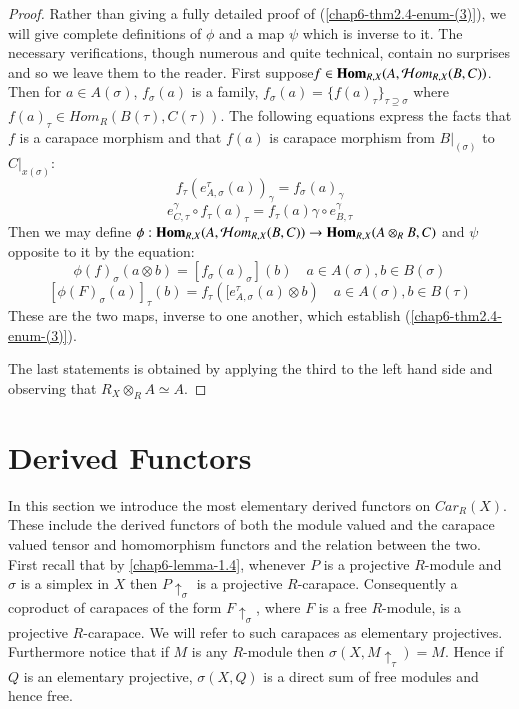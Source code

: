 \begin{proof}
Rather than giving a fully detailed proof of (\ref{chap6-thm2.4-enum-(3)}), we will give complete definitions of $\phi$ and a map $\psi$ which is inverse to it. The necessary verifications, though numerous and quite technical, contain no surprises and so we leave them to the reader. First suppose\break $f \in \operatorname{\mathbf{Hom}}_{R,X}(A, \mathcal{H} om_{R,X}(B, C))$. Then for
$a \in A(\sigma)$, $f_{\sigma}(a)$ is a family, $f_{\sigma}(a)  =\{f(a)_{\tau}\}_{\tau \supseteq \sigma}$ where
$f(a)_{\tau} \in Hom_{R}(B(\tau), C(\tau))$. The following equations express the facts that $f$ is a carapace morphism and that $f(a)$ is carapace morphism from $B|_(\sigma)$ to $C|_{x(\sigma)}$:
\begin{equation}\label{chap6-eq-5}
f_{\tau}(e_{A,\sigma}^{\tau}(a))_{\gamma} = f_{\sigma}(a)_{\gamma}%
\end{equation}
\begin{equation}\label{chap6-eq-6}
e_{C, \tau}^{\gamma} \circ f_{\tau}(a)_{\tau} = f_{\tau}(a)\gamma \circ e_{B,\tau}^{\gamma}
\end{equation}
Then we may define $\phi : \operatorname{\mathbf{Hom}}_{R,X}(A, \mathcal{H} om_{R,X}(B,C))\rightarrow \operatorname{\mathbf{Hom}}_{R,X}(A \otimes_{R}B, C)$ and $\psi$ opposite to it by the equation:
\begin{equation}\label{chap6-eq-7}
\phi(f)_{\sigma}(a\otimes b) =[f_{\sigma}(a)_{\sigma}](b) \quad a\in A(\sigma), b\in B(\sigma)
\end{equation}
\begin{equation}\label{chap6-eq-8}
[\phi (F)_{\sigma}(a)]_{\tau}(b) = f_{\tau}([e_{A, \sigma}^{\tau}(a)\otimes b) \quad a\in A(\sigma), b \in B(\tau)
\end{equation}
These are the two maps, inverse to one another, which establish (\ref{chap6-thm2.4-enum-(3)}).

The last statements is obtained by applying the third to the left hand side and observing that $R_{X}\otimes_{R}A\simeq A$.
\end{proof}

\section{Derived Functors}\label{chap6-sec-3}

In this section we introduce the most elementary derived functors on $C ar_{R}(X)$. These include the derived functors of both the module valued and the carapace valued tensor and homomorphism functors and the relation between the two. First recall that by \ref{chap6-lemma-1.4}, whenever $P$ is a projective $R$-module and $\sigma$ is a simplex in $X$ then $P\uparrow_{\sigma}$ is a projective $R$-carapace. Consequently a coproduct of carapaces of the form $F \uparrow_{\sigma}$, where $F$ is a free $R$-module, is a projective $R$-carapace. We will refer to such carapaces as elementary projectives. Furthermore notice that if $M$ is any $R$-module then $\sigma(X, M\uparrow_{\tau})=M$. Hence if $Q$ is an elementary projective, $\sigma(X, Q)$ is a direct sum of free modules and hence free.

